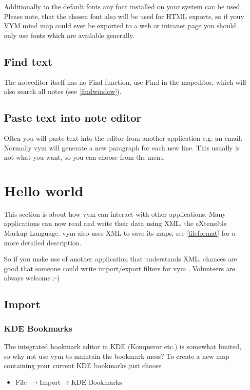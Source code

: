 \documentclass[12pt,a4paper]{article}
\newcommand{\vym}{{\sc vym }}
\newcommand{\ra}{$\longrightarrow$}
\begin{document}
Additionally to the default fonts any font installed on your system can
be used. Please note, that the chosen font also will be used for HTML
exports, so if youy VYM mind map could ever be exported to a web or intranet page you should only use fonts which are available generally.

\subsection{Find text}
The noteeditor itself has no Find function, use Find in the mapeditor,
which will also search all notes (see \ref{findwindow}).

\subsection{Paste text into note editor}
Often you will paste text into the editor from another application e.g.
an email. Normally \vym will generate a new paragraph for each new line.
This usually is not what you want, so you can choose from the menu


\section{Hello world}
This section is about how \vym can interact with other applications.
Many applications can now read and write their data using XML, the
eXtensible Markup Language. \vym also uses XML to save its maps, see
\ref{fileformat} for a more detailed description. 

So if you make use of another application that understands XML, chances are good that someone
could write import/export filters for \vym. Volunteers are always
welcome ;-)

\subsection{Import} \label{import}

\subsubsection*{KDE Bookmarks}
The integrated bookmark editor in KDE (Konqueror etc.) is somewhat limited, so why not
use \vym to maintain the bookmark mess? To create a new map containing
your current KDE bookmarks just choose
\begin{itemize}
    \item File \ra Import\ra KDE Bookmarks
\end{itemize}
\end{document}
